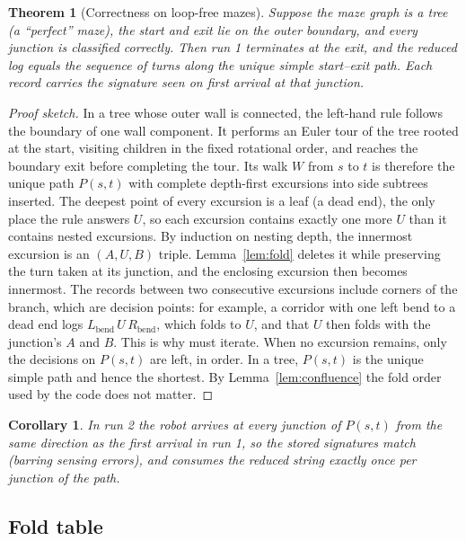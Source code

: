 \documentclass[11pt,a4paper]{article}
\newcommand{\code}[1]{\texttt{\detokenize{#1}}}
\theoremstyle{plain}
\newtheorem{theorem}{Theorem}
\newtheorem{corollary}{Corollary}
\theoremstyle{definition}
\begin{document}
\begin{theorem}[Correctness on loop-free mazes]\label{thm:tree}
Suppose the maze graph is a tree (a ``perfect'' maze), the start and exit
lie on the outer boundary, and every junction is classified correctly. Then
run 1 terminates at the exit, and the reduced log equals the sequence of
turns along the unique simple start--exit path. Each record carries the
signature seen on first arrival at that junction.
\end{theorem}
\begin{proof}[Proof sketch]
In a tree whose outer wall is connected, the left-hand rule follows the
boundary of one wall component. It performs an Euler tour of the tree
rooted at the start, visiting children in the fixed rotational order, and
reaches the boundary exit before completing the tour. Its walk $W$ from $s$
to $t$ is therefore the unique path $P(s,t)$ with complete depth-first
excursions into side subtrees inserted. The deepest point of every
excursion is a leaf (a dead end), the only place the rule answers $U$, so
each excursion contains exactly one more $U$ than it contains nested
excursions. By induction on nesting depth, the innermost excursion is an
$(A,U,B)$ triple. Lemma~\ref{lem:fold} deletes it while preserving the
turn taken at its junction, and the enclosing excursion then becomes
innermost. The records between two consecutive excursions include corners
of the branch, which are decision points: for example, a corridor with one
left bend to a dead end logs $L_{\text{bend}}\,U\,R_{\text{bend}}$, which
folds to $U$, and that $U$ then folds with the junction's $A$ and $B$. This
is why \code{WallMem_Reduce} must iterate. When no excursion remains, only
the decisions on $P(s,t)$ are left, in order. In a tree, $P(s,t)$ is the
unique simple path and hence the shortest. By Lemma~\ref{lem:confluence}
the fold order used by the code does not matter.
\end{proof}

\begin{corollary}
In run 2 the robot arrives at every junction of $P(s,t)$ from the same
direction as the first arrival in run 1, so the stored signatures match
(barring sensing errors), and \code{WallMem_Play} consumes the reduced
string exactly once per junction of the path.
\end{corollary}

\subsection{Fold table}
\end{document}
